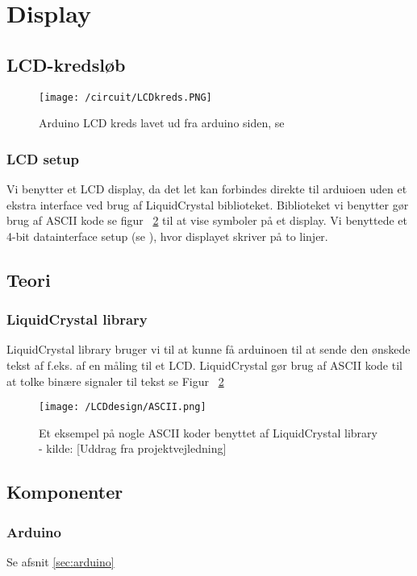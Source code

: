 \section{Display}

\subsection{LCD-kredsløb}
\begin{figure}[H]
	\centering
    \texttt{[image: /circuit/LCDkreds.PNG]}
	\caption{Arduino LCD kreds lavet ud fra arduino siden, se \cite{arduinoLCD}}
	\label{arduinoLCD}
\end{figure}
\subsubsection{LCD setup}
Vi benytter et LCD display, da det let kan forbindes direkte til arduioen uden et ekstra interface ved brug af LiquidCrystal biblioteket. Biblioteket vi benytter gør brug af ASCII kode se figur ~\ref{ASCII} til at vise symboler på et display.
Vi benyttede et 4-bit datainterface setup (se \cite{arduinoLCD}), hvor displayet skriver på to linjer.




\subsection{Teori}
\subsubsection{LiquidCrystal library}
LiquidCrystal library bruger vi til at kunne få arduinoen til at sende den ønskede tekst af f.eks. af en måling til et LCD. LiquidCrystal gør brug af ASCII kode til at tolke binære signaler til tekst se Figur ~\ref{ASCII}
\begin{figure}[H]
	\centering
    \texttt{[image: /LCDdesign/ASCII.png]}
	\caption{Et eksempel på nogle ASCII koder benyttet af LiquidCrystal library - kilde: [Uddrag fra projektvejledning]}
	\label{ASCII}
\end{figure}
\subsection{Komponenter}
\subsubsection{Arduino}
Se afsnit \ref{sec:arduino} 

